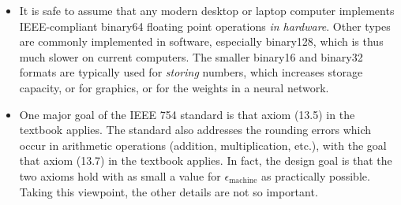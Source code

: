 \documentclass[11pt]{amsart}
\newcommand{\eps}{\epsilon}
\begin{document}
\begin{itemize}
\item It is safe to assume that any modern desktop or laptop computer implements IEEE-compliant binary64 floating point operations \emph{in hardware}.  Other types are commonly implemented in software, especially binary128, which is thus much slower on current computers.  The smaller binary16 and binary32 formats are typically used for \emph{storing} numbers, which increases storage capacity, or for graphics, or for the weights in a neural network.

\item One major goal of the IEEE 754 standard is that axiom (13.5) in the textbook applies.  The standard also addresses the rounding errors which occur in arithmetic operations (addition, multiplication, etc.), with the goal that axiom (13.7) in the textbook applies.  In fact, the design goal is that the two axioms hold with as small a value for $\eps_{\text{machine}}$ as practically possible.  Taking this viewpoint, the other details are not so important.

\end{itemize}
\end{document}
